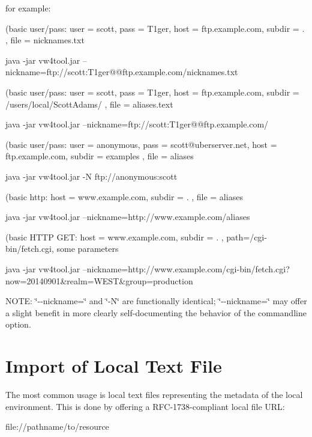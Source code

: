 for example\+:

(basic user/pass\+: user = scott, pass = T1ger, host = ftp.\+example.\+com, subdir = . , file = nicknames.\+txt \begin{DoxyVerb}java -jar vw4tool.jar --nickname=ftp://scott:T1ger@@ftp.example.com/nicknames.txt
\end{DoxyVerb}


(basic user/pass\+: user = scott, pass = T1ger, host = ftp.\+example.\+com, subdir = /users/local/\+Scott\+Adams/ , file = aliases.\+text \begin{DoxyVerb}java -jar vw4tool.jar --nickname=ftp://scott:T1ger@@ftp.example.com/%
\end{DoxyVerb}


(basic user/pass\+: user = anonymous, pass = scott@uberserver.\+net, host = ftp.\+example.\+com, subdir = examples , file = aliases \begin{DoxyVerb}java -jar vw4tool.jar -N ftp://anonymous:scott%
\end{DoxyVerb}


(basic http\+: host = www.\+example.\+com, subdir = . , file = aliases \begin{DoxyVerb}java -jar vw4tool.jar --nickname=http://www.example.com/aliases
\end{DoxyVerb}


(basic H\+T\+T\+P G\+E\+T\+: host = www.\+example.\+com, subdir = . , path=/cgi-\/bin/fetch.cgi, some parameters \begin{DoxyVerb}java -jar vw4tool.jar --nickname=http://www.example.com/cgi-bin/fetch.cgi?now=20140901&realm=WEST&group=production
\end{DoxyVerb}


N\+O\+T\+E\+: \char`\"{}-\/-\/nickname=\char`\"{} and \char`\"{}-\/\+N\char`\"{} are functionally identical; \char`\"{}-\/-\/nickname=\char`\"{} may offer a slight benefit in more clearly self-\/documenting the behavior of the commandline option.

\section*{Import of Local Text File }

The most common usage is local text files representing the metadata of the local environment. This is done by offering a R\+F\+C-\/1738-\/compliant local file U\+R\+L\+: \begin{DoxyVerb}file://pathname/to/resource
\end{DoxyVerb}


